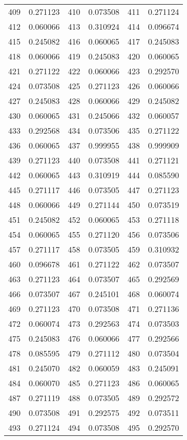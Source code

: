 \documentclass[12pt]{article}
\begin{document}
\begin{longtable}{@{}cc|cc|cc@{}}
409 & 0.271123 & 410 & 0.073508 & 411 & 0.271124 \\
412 & 0.060066 & 413 & 0.310924 & 414 & 0.096674 \\
415 & 0.245082 & 416 & 0.060065 & 417 & 0.245083 \\
418 & 0.060066 & 419 & 0.245083 & 420 & 0.060065 \\
421 & 0.271122 & 422 & 0.060066 & 423 & 0.292570 \\
424 & 0.073508 & 425 & 0.271123 & 426 & 0.060066 \\
427 & 0.245083 & 428 & 0.060066 & 429 & 0.245082 \\
430 & 0.060065 & 431 & 0.245066 & 432 & 0.060057 \\
433 & 0.292568 & 434 & 0.073506 & 435 & 0.271122 \\
436 & 0.060065 & 437 & 0.999955 & 438 & 0.999909 \\
439 & 0.271123 & 440 & 0.073508 & 441 & 0.271121 \\
442 & 0.060065 & 443 & 0.310919 & 444 & 0.085590 \\
445 & 0.271117 & 446 & 0.073505 & 447 & 0.271123 \\
448 & 0.060066 & 449 & 0.271144 & 450 & 0.073519 \\
451 & 0.245082 & 452 & 0.060065 & 453 & 0.271118 \\
454 & 0.060065 & 455 & 0.271120 & 456 & 0.073506 \\
457 & 0.271117 & 458 & 0.073505 & 459 & 0.310932 \\
460 & 0.096678 & 461 & 0.271122 & 462 & 0.073507 \\
463 & 0.271123 & 464 & 0.073507 & 465 & 0.292569 \\
466 & 0.073507 & 467 & 0.245101 & 468 & 0.060074 \\
469 & 0.271123 & 470 & 0.073508 & 471 & 0.271136 \\
472 & 0.060074 & 473 & 0.292563 & 474 & 0.073503 \\
475 & 0.245083 & 476 & 0.060066 & 477 & 0.292566 \\
478 & 0.085595 & 479 & 0.271112 & 480 & 0.073504 \\
481 & 0.245070 & 482 & 0.060059 & 483 & 0.245091 \\
484 & 0.060070 & 485 & 0.271123 & 486 & 0.060065 \\
487 & 0.271119 & 488 & 0.073505 & 489 & 0.292572 \\
490 & 0.073508 & 491 & 0.292575 & 492 & 0.073511 \\
493 & 0.271124 & 494 & 0.073508 & 495 & 0.292570 \\

\end{longtable}
\end{document}
